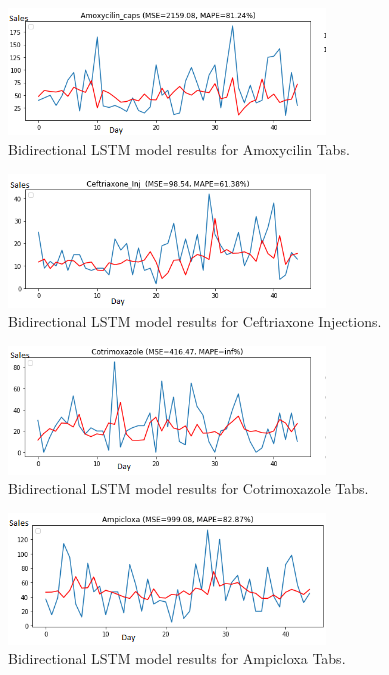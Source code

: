 \documentclass[12pt]{report}
\begin{document}
\begin{figure}[H]%
  \begin {center}
  \includegraphics[width=0.75\textwidth]{images/bi (5)A.png}
  \caption{Bidirectional LSTM model results for Amoxycilin Tabs.}
  \label{fig:ecg}
  \end {center}
\end{figure}

\begin{figure}[H]%
  \begin {center}
  \includegraphics[width=0.75\textwidth]{images/bi (5)B.png}
  \caption{Bidirectional LSTM model results for Ceftriaxone Injections.}
  \label{fig:ecg}
  \end {center}
\end{figure}


\begin{figure}[H]%
  \begin {center}
  \includegraphics[width=0.75\textwidth]{images/bi (5)C.png}
  \caption{Bidirectional LSTM model results for Cotrimoxazole Tabs.}
  \label{fig:ecg}
  \end {center}
\end{figure}

\begin{figure}[H]%
  \begin {center}
  \includegraphics[width=0.75\textwidth]{images/bi (6)A.png}
  \caption{Bidirectional LSTM model results for Ampicloxa Tabs.}
  \label{fig:ecg}
  \end {center}
\end{figure}
\end{document}
